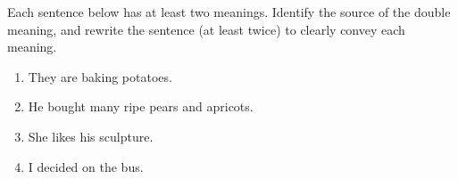 Each sentence below has at least two meanings.  Identify the source of the double meaning, and rewrite the sentence (at least twice) to clearly convey each meaning.
%
\begin{enumerate}
\item They are baking potatoes.
\item He bought many ripe pears and apricots.
\item She likes his sculpture.
\item I decided on the bus.
\end{enumerate}